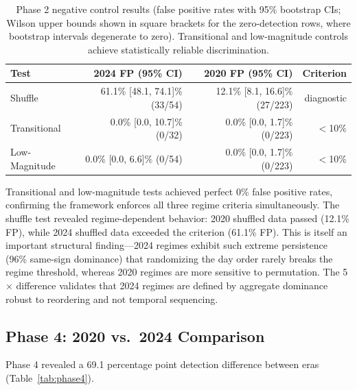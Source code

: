 \documentclass[jrfm,article,accept,moreauthors,pdftex]{Definitions/mdpi}
\begin{document}
\begin{table}[H]
\small
\caption{Phase 2 negative control results (false positive rates with 95\% bootstrap CIs; Wilson upper bounds shown in square brackets for the zero-detection rows, where bootstrap intervals degenerate to zero). Transitional and low-magnitude controls achieve statistically reliable discrimination.}
\label{tab:negative_controls}
\begin{tabularx}{\textwidth}{lRRr}
\toprule
\textbf{Test} & \textbf{2024 FP (95\% CI)} & \textbf{2020 FP (95\% CI)} & \textbf{Criterion} \\
\midrule
Shuffle & 61.1\% [48.1, 74.1]\% (33/54) & 12.1\% [8.1, 16.6]\% (27/223) & diagnostic \\
Transitional & 0.0\% [0.0, 10.7]\% (0/32) & 0.0\% [0.0, 1.7]\% (0/223) & $<$10\% \\
Low-Magnitude & 0.0\% [0.0, 6.6]\% (0/54) & 0.0\% [0.0, 1.7]\% (0/223) & $<$10\% \\
\bottomrule
\end{tabularx}
\end{table}

Transitional and low-magnitude tests achieved perfect 0\% false positive rates, confirming the framework enforces all three regime criteria simultaneously. The shuffle test revealed regime-dependent behavior: 2020 shuffled data passed (12.1\% FP), while 2024 shuffled data exceeded the criterion (61.1\% FP). This is itself an important structural finding---2024 regimes exhibit such extreme persistence (96\% same-sign dominance) that randomizing the day order rarely breaks the regime threshold, whereas 2020 regimes are more sensitive to permutation. The 5$\times$ difference validates that 2024 regimes are defined by aggregate dominance robust to reordering and not temporal sequencing.

\subsection{Phase 4: 2020 vs.\ 2024 Comparison}

Phase 4 revealed a 69.1 percentage point detection difference between eras (Table~\ref{tab:phase4}).
\end{document}

